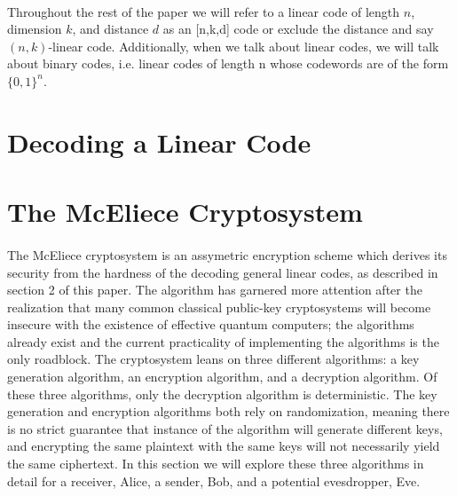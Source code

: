 \documentclass{article}
\theoremstyle{definition}
\begin{document}
\paragraph{} Throughout the rest of the paper we will refer to a linear code of length $n$, dimension $k$, and distance $d$ as an [n,k,d] code or exclude the distance and say $(n,k)$-linear code.  Additionally, when we talk about linear codes, we will talk about binary codes, i.e. linear codes of length n whose codewords are of the form $\{0,1\}^n$. 

\section{Decoding a Linear Code}

\section{The McEliece Cryptosystem}
\paragraph{} The McEliece cryptosystem is an assymetric encryption scheme which derives its security from the hardness of the decoding general linear codes, as described in section 2 of this paper.  The algorithm has garnered more attention after the realization that many common classical public-key cryptosystems will become insecure with the existence of effective quantum computers; the algorithms already exist and the current practicality of implementing the algorithms is the only roadblock.  The cryptosystem leans on three different algorithms: a key generation algorithm, an encryption algorithm, and a decryption algorithm.  Of these three algorithms, only the decryption algorithm is deterministic.  The key generation and encryption algorithms both rely on randomization, meaning there is no strict guarantee that instance of the algorithm will generate different keys, and encrypting the same plaintext with the same keys will not necessarily yield the same ciphertext.  In this section we will explore these three algorithms in detail for a receiver, Alice, a sender, Bob, and a potential evesdropper, Eve.
\end{document}
